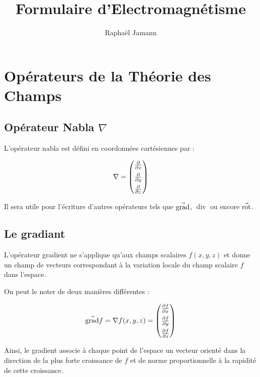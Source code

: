 \documentclass[a4paper,12pt]{article}
\title{Formulaire d'Electromagnétisme}
\author{Raphaël Jamann}
\date{}
\renewcommand{\grad}{\va{\operatorname{grad}}}
\newcommand{\rot}{\va{\operatorname{rot}}}
\renewcommand{\div}{\operatorname{div}}
\begin{document}
    \maketitle


    \section{Opérateurs de la Théorie des Champs}

        \subsection{Opérateur Nabla $\nabla$}
            L'opérateur nabla est défini en coordonnées cartésiennes par :

            $$ \nabla = \begin{pmatrix}
                    \pdv{}{x} \\[0.5em]  %
                    \pdv{}{y} \\[0.5em]
                    \pdv{}{z}
                \end{pmatrix} 
            $$

            Il sera utile pour l'écriture d'autres opérateurs tels que $\grad$, $\div$ ou encore $\rot$.

        \subsection{Le gradiant}
            L'opérateur gradient ne s'applique qu'aux champs scalaires $f(x, y, z)$ 
            et donne un champ de vecteurs correspondant à la variation locale du champ scalaire $f$ dans l'espace. 

             On peut le noter de deux manières différentes :

                $$ \grad f = \nabla f(x, y, z) = 
                \begin{pmatrix}
                    \pdv{f}{x} \\[0.5em]  %
                    \pdv{f}{y} \\[0.5em]
                    \pdv{f}{z}
                \end{pmatrix} $$
                

            Ainsi, le gradient associe à chaque point de l'espace un vecteur orienté 
            dans la direction de la plus forte croissance de $f$ et de norme proportionnelle 
            à la rapidité de cette croissance.
\end{document}
